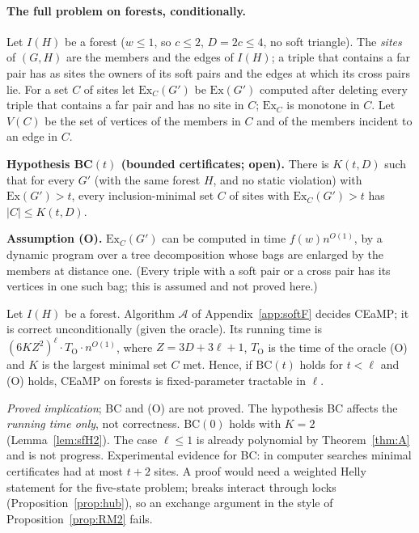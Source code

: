 \paragraph{The full problem on forests, conditionally.}
Let $I(H)$ be a forest ($w\le1$, so $c\le2$, $D=2c\le4$, no soft triangle). The \emph{sites} of $(G,H)$ are the members and the edges of $I(H)$; a triple that contains a far pair has as sites the owners of its soft pairs and the edges at which its cross pairs lie. For a set $C$ of sites let $\mathrm{Ex}_C(G')$ be $\mathrm{Ex}(G')$ computed after deleting every triple that contains a far pair and has no site in $C$; $\mathrm{Ex}_C$ is monotone in $C$. Let $V(C)$ be the set of vertices of the members in $C$ and of the members incident to an edge in $C$.

\textbf{Hypothesis BC$(t)$ (bounded certificates; open).} There is $K(t,D)$ such that for every $G'$ (with the same forest $H$, and no static violation) with $\mathrm{Ex}(G')>t$, every inclusion-minimal set $C$ of sites with $\mathrm{Ex}_C(G')>t$ has $|C|\le K(t,D)$.

\textbf{Assumption (O).} $\mathrm{Ex}_C(G')$ can be computed in time $f(w)n^{O(1)}$, by a dynamic program over a tree decomposition whose bags are enlarged by the members at distance one. (Every triple with a soft pair or a cross pair has its vertices in one such bag; this is assumed and not proved here.)
\begin{theorem}\label{thm:F}
Let $I(H)$ be a forest. Algorithm $\mathcal A$ of Appendix~\ref{app:softF} decides CEaMP; it is correct unconditionally (given the oracle). Its running time is $(6KZ^{2})^{\ell}\cdot T_{\mathrm{O}}\cdot n^{O(1)}$, where $Z=3D+3\ell+1$, $T_{\mathrm{O}}$ is the time of the oracle (O) and $K$ is the largest minimal set $C$ met. Hence, if BC$(t)$ holds for $t<\ell$ and (O) holds, CEaMP on forests is fixed-parameter tractable in $\ell$.
\end{theorem}
\emph{Proved implication}; BC and (O) are not proved. The hypothesis BC affects the \emph{running time only}, not correctness. BC$(0)$ holds with $K=2$ (Lemma~\ref{lem:sfH2}). The case $\ell\le1$ is already polynomial by Theorem~\ref{thm:A} and is not progress. Experimental evidence for BC: in computer searches minimal certificates had at most $t+2$ sites. A proof would need a weighted Helly statement for the five-state problem; breaks interact through locks (Proposition~\ref{prop:hub}), so an exchange argument in the style of Proposition~\ref{prop:RM2} fails.

